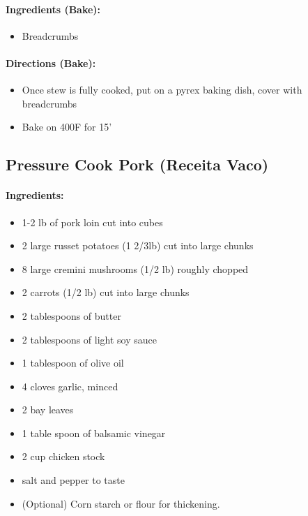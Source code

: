 \documentclass{article}
\begin{document}
\paragraph{Ingredients (Bake):}
\begin{itemize}
	\item Breadcrumbs
\end{itemize}

\paragraph{Directions (Bake):}
\begin{itemize}
	\item Once stew is fully cooked, put on a pyrex baking dish, cover with breadcrumbs
	\item Bake on 400F for 15'
\end{itemize}

\subsection{Pressure Cook Pork (Receita Vaco)}

\paragraph{Ingredients:}
\begin{itemize}
	\item	1-2 lb of pork loin cut into cubes
	\item 2 large russet potatoes (1 2/3lb) cut into large chunks
	\item 8 large cremini mushrooms (1/2 lb) roughly chopped
	\item 2 carrots (1/2 lb) cut into large chunks
	\item 2 tablespoons of butter
	\item 2 tablespoons of light soy sauce
	\item 1 tablespoon of olive oil
	\item 4 cloves garlic, minced
	\item 2 bay leaves
	\item 1 table spoon of balsamic vinegar
	\item 2 cup chicken stock
	\item salt and pepper to taste
	\item (Optional) Corn starch or flour for thickening.
\end{itemize}
\end{document}
